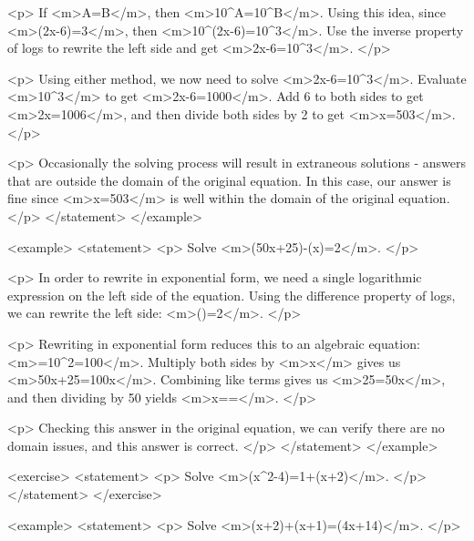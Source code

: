                 <p>
                    If <m>A=B</m>, then <m>10^{A}=10^{B}</m>.
                    Using this idea, since <m>\log(2x-6)=3</m>, then <m>10^{\log(2x-6)}=10^{3}</m>.
                    Use the inverse property of logs to rewrite the left side and get <m>2x-6=10^{3}</m>.
                </p>

                <p>
                    Using either method, we now need to solve <m>2x-6=10^{3}</m>.
                    Evaluate <m>10^{3}</m> to get <m>2x-6=1000</m>.
                    Add 6 to both sides to get <m>2x=1006</m>, and then divide both sides by 2 to get <m>x=503</m>.
                </p>

                <p>
                    Occasionally the solving process will result in extraneous solutions - answers that are outside the domain of the original equation.
                    In this case, our answer is fine since <m>x=503</m> is well within the domain of the original equation.
                </p>
            </statement>
        </example>

        <example>
            <statement>
                <p>
                    Solve <m>\log(50x+25)-\log(x)=2</m>.
                </p>

                <p>
                    In order to rewrite in exponential form, we need a single logarithmic expression on the left side of the equation.
                    Using the difference property of logs, we can rewrite the left side: <m>\log()=2</m>.
                </p>

                <p>
                    Rewriting in exponential form reduces this to an algebraic equation: <m>=10^{2}=100</m>.
                    Multiply both sides by <m>x</m> gives us <m>50x+25=100x</m>.
                    Combining like terms gives us <m>25=50x</m>, and then dividing by 50 yields <m>x==</m>.
                </p>

                <p>
                    Checking this answer in the original equation, we can verify there are no domain issues, and this answer is correct.
                </p>
            </statement>
        </example>

        <exercise>
            <statement>
                <p>
                    Solve <m>\log(x^{2}-4)=1+\log(x+2)</m>.
                </p>
            </statement>
        </exercise>

        <example>
            <statement>
                <p>
                    Solve <m>\ln(x+2)+\ln(x+1)=\ln(4x+14)</m>.
                </p>

